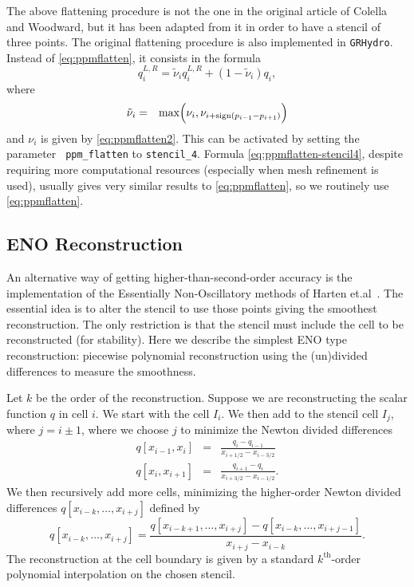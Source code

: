\documentclass{article}
\begin{document}
The above flattening procedure is not the one in the original article of Colella and Woodward, but
it has been adapted from it in order to have a stencil of three points.  The original flattening
procedure is also implemented in {\tt GRHydro}. Instead of \ref{eq:ppmflatten}, it consists in the formula
\begin{equation}
  \label{eq:ppmflatten-stencil4}
  q_i^{L,R} = \tilde \nu_i q_i^{L,R} + (1 - \tilde \nu_i) q_i,
\end{equation}
where
\begin{eqnarray}
\tilde \nu_i &=& {\rm max}\Big(\nu_i,\nu_{i+{\rm sign}(p_{i-1}-p_{i+1})}\Big)
\end{eqnarray}
and $\nu_i$ is given by \ref{eq:ppmflatten2}. This can be activated by setting the parameter {\tt
ppm\_flatten} to {\tt stencil\_4}. Formula \ref{eq:ppmflatten-stencil4}, despite requiring
more computational resources (especially when mesh refinement is used), usually gives very similar
results to \ref{eq:ppmflatten}, so we routinely use \ref{eq:ppmflatten}.


\subsection{ENO Reconstruction}
\label{sec:eno}

An alternative way of getting higher-than-second-order accuracy is the implementation of the
Essentially Non-Oscillatory methods of Harten et.al~\cite{eno}. The
essential idea is to alter the stencil to use those points giving the
smoothest reconstruction. The only restriction is that the stencil
must include the cell to be reconstructed (for stability). Here we
describe the simplest ENO type reconstruction: piecewise polynomial
reconstruction using the (un)divided differences to measure the
smoothness. 

Let $k$ be the order of the reconstruction. Suppose we are
reconstructing the scalar function $q$ in cell $i$. We start with the
cell $I_i$. We then add to the stencil cell $I_j$, where $j = i \pm
1$, where we choose $j$ to minimize the Newton divided differences
\begin{eqnarray}
  \label{enodd}
  q \left[ x_{i-1}, x_i \right] & = & \frac{q_i - q_{i-1}}{x_{i+1/2}
    - x_{i-3/2}} \\
  q \left[ x_i, x_{i+1} \right] & = & \frac{q_{i+1} - q_i}{x_{i+3/2}
    - x_{i-1/2}}.
\end{eqnarray}
\noindent We then recursively add more cells, minimizing the higher-order 
Newton divided differences $q \left[ x_{i-k}, \dots, x_{i+j} \right]$
defined by 
\begin{equation}
  \label{enodd2}
  q \left[ x_{i-k}, \dots, x_{i+j} \right] = \frac{ q \left[ x_{i-k+1},
  \dots, x_{i+j} \right] - q \left[ x_{i-k}, \dots, x_{i+j-1} \right]
  }{x_{i+j} - x_{i-k}}.
\end{equation}
\noindent The reconstruction at the cell boundary is given by a
standard $k^{\text{th}}$-order polynomial interpolation on the chosen
stencil. 
\end{document}
